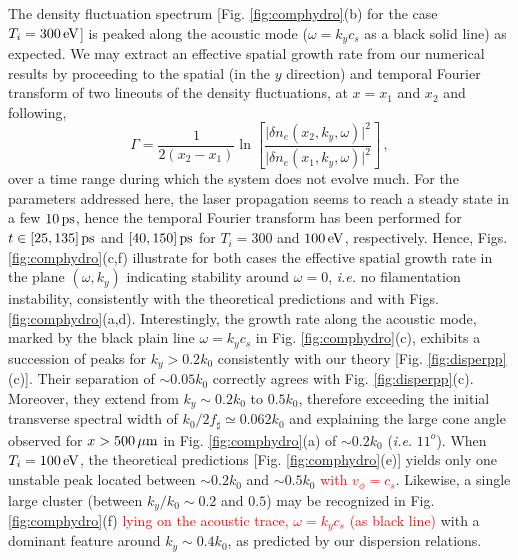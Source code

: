 \documentclass[
 reprint,
 superscriptaddress,
 amsmath,amssymb,
 aps,
]{revtex4-1}
\def\tc{\textcolor{red}}
\begin{document}
The   density fluctuation spectrum [Fig.  \ref{fig:comphydro}(b) for the case $T_i=300\,\rm eV$] is peaked along the acoustic mode ($\omega=k_yc_s$ as a black solid line) as expected. We may extract an effective spatial growth rate from our numerical results by proceeding to the spatial (in the $y$ direction) and temporal Fourier transform of two lineouts of the density fluctuations, at $x=x_1$ and $x_2$ and following,
\begin{equation}
    \Gamma = \frac{1}{2(x_2-x_1)} \ln \left[\frac{\vert \delta n_e(x_2,k_y,\omega)\vert^2}{\vert \delta n_e(x_1,k_y,\omega)\vert^2}\right] \, , \label{eq:gammah}
\end{equation}
over a time range during which the system does not evolve much. 
For the parameters addressed here, the laser propagation seems to  reach a steady state in a few $10\,\rm ps$, hence the temporal Fourier transform has been performed for $t\in [25,135]\,\rm ps$ and  $[40,150]\,\rm ps$ for  $T_i=300$ and $100\, \rm eV$, respectively. 
Hence, Figs.  \ref{fig:comphydro}(c,f) illustrate for both cases  the effective spatial growth rate  in the plane $(\omega,k_y)$ indicating stability around $\omega=0$, \emph{i.e.} no filamentation instability, consistently with the theoretical predictions and with Figs. \ref{fig:comphydro}(a,d). 
Interestingly, the growth rate along the acoustic mode, marked by the black plain line $\omega=k_yc_s$ in Fig. \ref{fig:comphydro}(c), exhibits a succession of peaks for $k_y>0.2k_0$ consistently with our theory [Fig. \ref{fig:disperpp}(c)]. Their separation of $\sim 0.05 k_0$ correctly agrees with Fig. \ref{fig:disperpp}(c). Moreover, they extend from $k_y \sim  0.2k_0$  to $0.5k_0$, therefore exceeding the initial transverse spectral width of $k_0/2f_\sharp  \simeq 0.062k_0$ and  explaining the large cone angle   observed for $x>500\,\rm\mu m$ in Fig. \ref{fig:comphydro}(a) of $\sim 0.2k_0$ (\emph{i.e.} $11^o$).
When $T_i=100\, \rm eV$, the theoretical predictions [Fig. \ref{fig:comphydro}(e)] yields only one unstable peak located between $\sim 0.2k_0$ and $\sim 0.5k_0$ \tc{with $v_\phi=c_s$}. Likewise, a single large cluster (between  $k_y/k_0\sim 0.2$ and $0.5$) may be recognized  in Fig. \ref{fig:comphydro}(f) \tc{lying on the acoustic trace, $\omega = k_yc_s$ (as black line)} with a dominant feature around $k_y\sim 0.4k_0$, as predicted by our dispersion relations.
\end{document}
